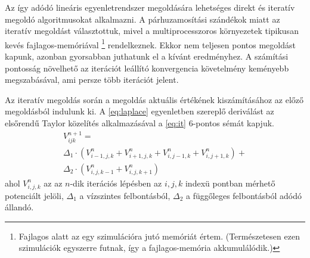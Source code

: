 	Az így adódó lineáris egyenletrendszer megoldására lehetséges direkt és iteratív megoldó
	algoritmusokat alkalmazni.
	A párhuzamosítási szándékok miatt az iteratív megoldást választottuk, mivel a multiprocesszoros
	környezetek tipikusan kevés fajlagos-memóriával \footnote{Fajlagos alatt az egy szimulációra jutó
	memóriát értem. (Természetesen ezen szimulációk egyszerre futnak, így a fajlagos-memória
	akkumulálódik.)} rendelkeznek.
	Ekkor nem teljesen pontos megoldást kapunk, azonban gyorsabban juthatunk el a kívánt eredményhez.
	A számítási pontosság növelhető az iterációt leállító konvergencia követelmény keményebb
	megszabásával, ami persze több iterációt jelent.
	
	Az iteratív megoldás során a megoldás aktuális értékének kiszámításához az előző megoldásból indulunk ki.
	A \eqref{eq:laplace} egyenletben szereplő deriválást az elsőrendű Taylor közelítés alkalmazásával a
	\eqref{eq:it} 6-pontos sémát kapjuk.
	\begin{multline} \label{eq:it} 
		V_{ijk}^{n+1} = \\ \Delta_1 \cdot \left(V_{i-1,j,k}^n+V_{i+1,j,k}^n
		+V_{i,j-1,k}^n+V_{i,j+1,k}^n\right)+ \\
						\Delta_2 \cdot \left(V_{i,j,k-1}^n+V_{i,j,k+1}^n\right)
	\end{multline}
	ahol $V_{i,j,k}^n$ az az $n$-dik iterációs lépésben az $i,j,k$ indexü
	pontban mérhető potenciált jelöli, $\Delta_1$ a vízszintes felbontásból,
	$\Delta_2$ a függőleges felbontásból adódó állandó.
	

